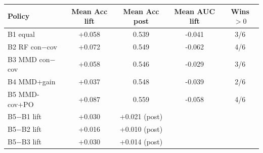 \begin{tabular}{lcccc}
\toprule
Policy & Mean Acc lift & Mean Acc post & Mean AUC lift & Wins $>0$ \\
\midrule
B1 equal & +0.058 & 0.539 & -0.041 & 3/6 \\
B2 RF con$-$cov & +0.072 & 0.549 & -0.062 & 4/6 \\
B3 MMD con$-$cov & +0.058 & 0.546 & -0.029 & 3/6 \\
B4 MMD+gain & +0.037 & 0.548 & -0.039 & 2/6 \\
B5 MMD-cov+PO & +0.087 & 0.559 & -0.058 & 4/6 \\
\midrule
B5$-$B1 lift & +0.030 & +0.021 (post) & & \\
B5$-$B2 lift & +0.016 & +0.010 (post) & & \\
B5$-$B3 lift & +0.030 & +0.014 (post) & & \\
\bottomrule
\end{tabular}